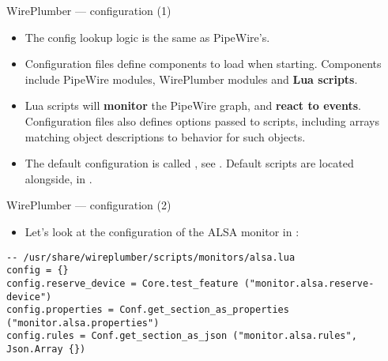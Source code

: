 \begin{frame}{WirePlumber — configuration (1)}
  \begin{itemize}


  \item The config lookup logic is the same as PipeWire's.

  \item Configuration files define components to load when starting. Components
    include PipeWire modules, WirePlumber modules and \textbf{Lua scripts}.

  \item Lua scripts will \textbf{monitor} the PipeWire graph, and
    \textbf{react to events}. Configuration files also defines options passed
    to scripts, including arrays matching object descriptions to behavior for
    such objects.

  \item The default configuration is called , see
    . Default scripts are located
    alongside, in .

  \end{itemize}
\end{frame}



\begin{frame}[fragile]{WirePlumber — configuration (2)}
  \begin{itemize}
  \item Let's look at the configuration of the ALSA monitor
    in :
  \end{itemize}

    \begin{block}{}
      \fontsize{10}{10}\selectfont
        \begin{verbatim}
-- /usr/share/wireplumber/scripts/monitors/alsa.lua
config = {}
config.reserve_device = Core.test_feature ("monitor.alsa.reserve-device")
config.properties = Conf.get_section_as_properties ("monitor.alsa.properties")
config.rules = Conf.get_section_as_json ("monitor.alsa.rules", Json.Array {})
          \end{verbatim}
        \end{block}
\end{frame}



